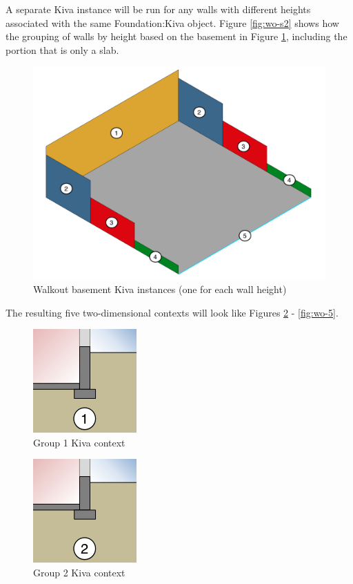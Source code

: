 A separate Kiva instance will be run for any walls with different
heights associated with the same Foundation:Kiva object. Figure
\ref{fig:wo-s2} shows how the grouping of walls by height based on the
basement in Figure \ref{fig:wo-w}, including the portion that is only a
slab.

\begin{figure}
\centering
\includegraphics{media/kiva-walkout-walls.png}
\caption{Walkout basement Kiva instances (one for each wall
height)\label{fig:wo-w}}
\end{figure}

The resulting five two-dimensional contexts will look like Figures
\ref{fig:wo-1} - \ref{fig:wo-5}.

\begin{figure}
\centering
\includegraphics{media/kiva-walkout-2d-1.png}
\caption{Group 1 Kiva context\label{fig:wo-1}}
\end{figure}

\begin{figure}
\centering
\includegraphics{media/kiva-walkout-2d-2.png}
\caption{Group 2 Kiva context\label{fig:wo-2}}
\end{figure}

